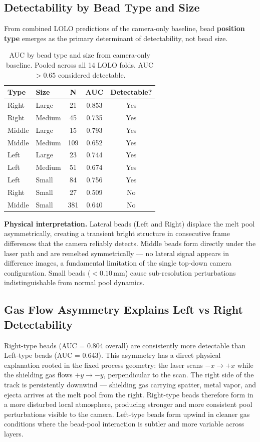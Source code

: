 \documentclass[12pt, letterpaper]{article}
\begin{document}
\subsection{Detectability by Bead Type and Size}

From combined LOLO predictions of the camera-only baseline,
bead \textbf{position type} emerges as the primary determinant
of detectability, not bead size.

\begin{table}[H]
\centering
\caption{AUC by bead type and size from camera-only baseline.
Pooled across all 14 LOLO folds. AUC $> 0.65$ considered
detectable.}
\begin{tabular}{llccc}
\toprule
Type & Size & N & AUC & Detectable? \\
\midrule
Right  & Large  & 21  & 0.853 & Yes \\
Right  & Medium & 45  & 0.735 & Yes \\
Middle & Large  & 15  & 0.793 & Yes \\
Middle & Medium & 109 & 0.652 & Yes \\
Left   & Large  & 23  & 0.744 & Yes \\
Left   & Medium & 51  & 0.674 & Yes \\
Left   & Small  & 84  & 0.756 & Yes \\
Right  & Small  & 27  & 0.509 & No \\
Middle & Small  & 381 & 0.640 & No \\
\bottomrule
\end{tabular}
\end{table}

\textbf{Physical interpretation.} Lateral beads (Left and Right)
displace the melt pool asymmetrically, creating a transient
bright structure in consecutive frame differences that the
camera reliably detects. Middle beads form directly under
the laser path and are remelted symmetrically — no lateral
signal appears in difference images, a fundamental limitation
of the single top-down camera configuration. Small beads
($< 0.10$\,mm) cause sub-resolution perturbations
indistinguishable from normal pool dynamics.

\subsection{Gas Flow Asymmetry Explains Left vs Right Detectability}

Right-type beads (AUC = 0.804 overall) are consistently more
detectable than Left-type beads (AUC = 0.643). This asymmetry
has a direct physical explanation rooted in the fixed process
geometry: the laser scans $-x \to +x$ while the shielding gas
flows $+y \to -y$, perpendicular to the scan. The right side
of the track is persistently downwind — shielding gas carrying
spatter, metal vapor, and ejecta arrives at the melt pool from
the right. Right-type beads therefore form in a more disturbed
local atmosphere, producing stronger and more consistent pool
perturbations visible to the camera. Left-type beads form
upwind in cleaner gas conditions where the bead-pool
interaction is subtler and more variable across layers.
\end{document}
